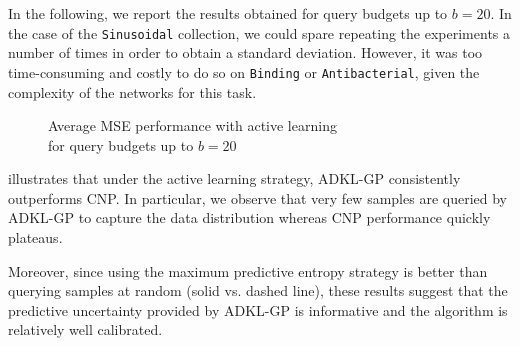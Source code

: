 \documentclass[11pt]{article}
\numberwithin{equation}{subsection}
\begin{document}
In the following, we report the results obtained for query budgets up to $b = 20$. In the case of the \texttt{Sinusoidal} collection, we could spare repeating the experiments a number of times in order to obtain a standard deviation. However, it was too time-consuming and costly to do so on \texttt{Binding} or \texttt{Antibacterial}, given the complexity of the networks for this task.

\begin{figure}[ht]
  \caption{Average MSE performance with active learning\\for query budgets up to $b = 20$}
  \label{fig:active}
\end{figure}

 illustrates that under the active learning strategy, ADKL-GP consistently outperforms CNP.
In particular, we observe that very few samples are queried by ADKL-GP to capture the data distribution whereas CNP performance quickly plateaus.

Moreover, since using the maximum predictive entropy strategy is better than querying samples at random (solid vs. dashed line), these results suggest that the predictive uncertainty provided by ADKL-GP is informative and the algorithm is relatively well calibrated.
\end{document}
